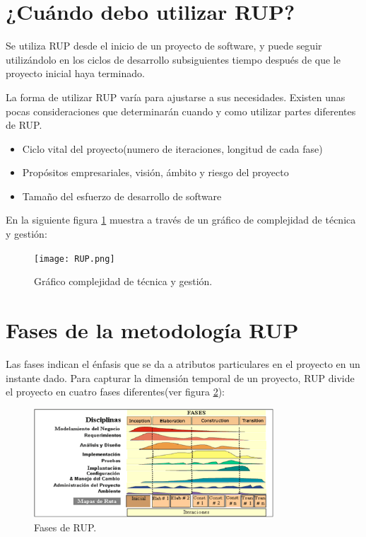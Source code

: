 \documentclass[spanish]{udpreport}
\begin{document}
\section{¿Cuándo debo utilizar RUP?}
\label{sec: Cuando debo utilizar RUP}
Se utiliza RUP desde el inicio de  un proyecto de software, y puede seguir utilizándolo en los ciclos de desarrollo subsiguientes tiempo después de que le proyecto inicial haya terminado. \par
La forma de utilizar RUP varía para ajustarse a sus necesidades. Existen unas pocas consideraciones que determinarán cuando y como utilizar partes diferentes de RUP.
\begin{itemize}
\item Ciclo vital del proyecto(numero de iteraciones, longitud de cada fase)
\item Propósitos empresariales, visión, ámbito y riesgo del proyecto
\item Tamaño del esfuerzo de desarrollo de software
\end{itemize}
En la siguiente figura \ref{fig:grafico} muestra a través de un gráfico de complejidad de técnica y gestión:

\begin{figure}[h]
	\centering
	\texttt{[image: RUP.png]}
	\caption{\label{fig:grafico}Gráfico complejidad de técnica y gestión.}
\end{figure}

\section{Fases de la metodología RUP}
Las fases indican el énfasis que se da a atributos particulares en el proyecto en un instante dado. Para capturar la dimensión temporal de un proyecto, RUP divide el proyecto en cuatro fases diferentes(ver figura \ref{fig:fases}):

\begin{figure}[!h]
	\centering
	\includegraphics[width=0.8\textwidth]{fases.png}
	\caption{\label{fig:fases}Fases de RUP.}
\end{figure}
\end{document}
